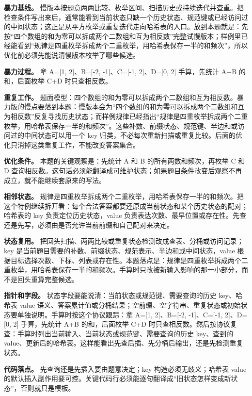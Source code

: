 \textbf{暴力基线。} 慢版本按题意两两比较、枚举区间、扫描历史或持续迭代并查重。把检查条件写出来后，通常能看到当前状态只缺一个历史状态、规范键或已经访问过的中间状态；这正是从平方枚举或重复迭代走向哈希表的入口。放到本题就是：先按“四个数组的和为零可以拆成两个二数组和互为相反数”完整试慢版本；样例里已经能看到“规律是四重枚举拆成两个二重枚举，用哈希表保存一半的和频次”，所以优化前必须先能说清慢版本枚举了哪些候选。

\textbf{暴力过程。} 拿 A=[1, 2]、B=[-2, -1]、C=[-1, 2]、D=[0, 2] 手算，先统计 A+B 的和，后面枚举 C+D 时只查相反数。

\textbf{重复工作。} 题面模型：四个数组的和为零可以拆成两个二数组和互为相反数。暴力版的慢点要落到本题：慢版本会为“四个数组的和为零可以拆成两个二数组和互为相反数”反复寻找历史状态；而样例规律已经指出“规律是四重枚举拆成两个二重枚举，用哈希表保存一半的和频次”。这些补数、前缀状态、规范键、半边和或访问过的中间状态可以用一个 key 归类，不必每次重新扫描或重复比较。后面的优化只消掉这类重复工作，不能改变答案集合。

\textbf{优化条件。} 本题的关键观察是：先统计 A 和 B 的所有两数和频次，再枚举 C 和 D 查询相反数。这句话必须能翻译成可维护状态；如果题目条件改变后观察不再成立，就不能继续套原来的写法。

\textbf{相邻状态。} 规律是四重枚举拆成两个二重枚举，用哈希表保存一半的和频次。把这个特例继续拆开看：每个合法答案都要还原成当前状态和某个历史状态的配对；哈希表的 key 负责定位历史状态，value 负责表达次数、最早位置或存在性。先查还是先写，必须由是否允许当前前缀和自己配对来决定。

\textbf{状态复用。} 把回头扫描、两两比较或重复状态检测改成查表、分桶或访问记录；key 是当前题目需要的补数、前缀状态、规范表示、半边和或中间状态，value 根据目标选择次数、下标、列表或存在性。本题落点是：规律是四重枚举拆成两个二重枚举，用哈希表保存一半的和频次。手算时只改被新输入影响的那一小部分，而不是回头重算完整候选。

\textbf{指针和字段。} 状态字段要能说清：当前状态或规范键、需要查询的历史 key、哈希表 value 语义、答案累计值或分桶结果；空前缀、空字符串、重复状态或初始状态要单独说明。手算时按这个协议跟踪：拿 A=[1, 2]、B=[-2, -1]、C=[-1, 2]、D=[0, 2] 手算，先统计 A+B 的和，后面枚举 C+D 时只查相反数。然后按协议复查：手算时列出当前输入、当前状态或规范键、需要查询的历史 key、查到的 value、更新后的哈希表。这样能看出先查后插、先分桶后输出，还是先检测重复状态。

\textbf{代码落点。} 先查询还是先插入要由题意决定；key 构造必须无歧义；哈希表 value 的默认插入副作用要可控。关键代码行必须能逐句翻译成“旧状态怎样变成新状态”，否则就只是模板。

